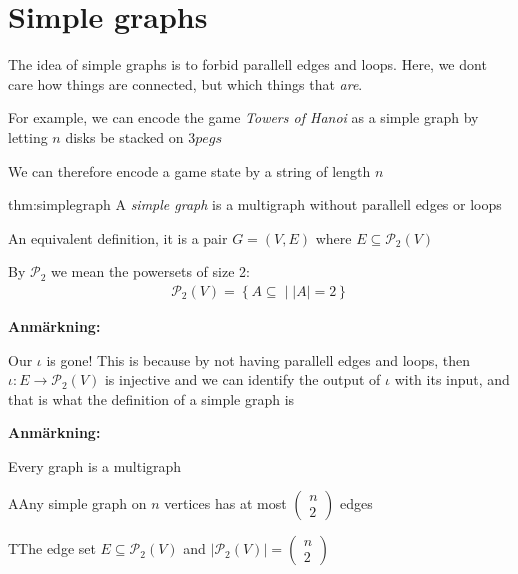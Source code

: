 \section{Simple graphs}\par
\noindent The idea of simple graphs is to forbid parallell edges and loops. Here, we dont care how things are connected, but which things that \textit{are}.
\par\bigskip
\noindent For example, we can encode the game \textit{Towers of Hanoi} as a simple graph by letting $n$ disks be stacked on $3 pegs$ \par
\noindent We can therefore encode a game state by a string of length $n$
\par\bigskip
\begin{theo}{thm:simplegraph}
  A \textit{simple graph} is a multigraph  without parallell edges or loops\par
  \noindent An equivalent definition, it is a pair $G = (V,E)$ where $E\subseteq\mathcal{P}_2(V)$
  \par\bigskip
  \noindent By $\mathcal{P}_2$ we mean the powersets of size 2:
  \begin{equation*}
    \begin{gathered}
    \mathcal{P}_2(V) = \left\{A\subseteq\;|\; \left|A\right|=2\right\}
    \end{gathered}
  \end{equation*}
  \par\bigskip
  \noindent\textbf{Anmärkning:}\par
  \noindent Our $\iota$ is gone! This is because by not having parallell edges and loops, then $\iota:E\to\mathcal{P}_2(V)$ is injective and we can identify the output of $\iota$ with its input, and that is what the definition of a simple graph is 
\end{theo}
\par\bigskip
\noindent\textbf{Anmärkning:}\par
\noindent Every graph is a multigraph
\par\bigskip
\begin{lem}
  AAny simple graph on $n$ vertices has at most $\begin{pmatrix}n\\2\end{pmatrix}$ edges
\end{lem}
\par\bigskip
\begin{prf}
  TThe edge set $E\subseteq\mathcal{P}_2(V)$ and $\left|\mathcal{P}_2(V)\right|=\begin{pmatrix}n\\2\end{pmatrix}$
\end{prf}

